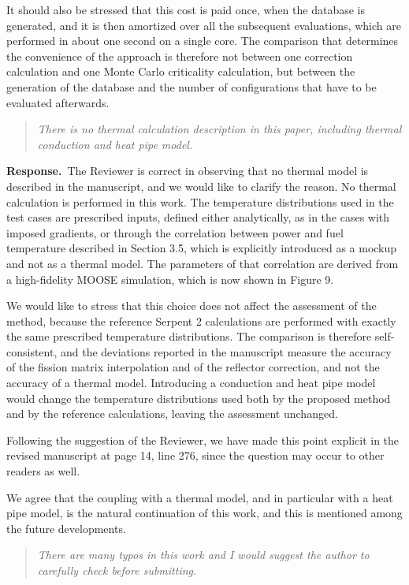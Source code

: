 \documentclass[11pt]{article}
\newenvironment{reviewer}%
  {\medskip\begin{quote}\itshape\color{black!70}}%
  {\end{quote}}
\newcommand{\answer}{\textbf{Response.}\ }
\begin{document}
It should also be stressed that this cost is paid once, when the database is generated, and it is then amortized over all the subsequent evaluations, which are performed in about one second on a single core. The comparison that determines the convenience of the approach is therefore not between one correction calculation and one Monte Carlo criticality calculation, but between the generation of the database and the number of configurations that have to be evaluated afterwards.

\begin{reviewer}
There is no thermal calculation description in this paper, including thermal conduction and heat pipe model.
\end{reviewer}

\answer The Reviewer is correct in observing that no thermal model is described in the manuscript, and we would like to clarify the reason. No thermal calculation is performed in this work. The temperature distributions used in the test cases are prescribed inputs, defined either analytically, as in the cases with imposed gradients, or through the correlation between power and fuel temperature described in Section 3.5, which is explicitly introduced as a mockup and not as a thermal model. The parameters of that correlation are derived from a high-fidelity MOOSE simulation, which is now shown in Figure 9.

We would like to stress that this choice does not affect the assessment of the method, because the reference Serpent 2 calculations are performed with exactly the same prescribed temperature distributions. The comparison is therefore self-consistent, and the deviations reported in the manuscript measure the accuracy of the fission matrix interpolation and of the reflector correction, and not the accuracy of a thermal model. Introducing a conduction and heat pipe model would change the temperature distributions used both by the proposed method and by the reference calculations, leaving the assessment unchanged.

Following the suggestion of the Reviewer, we have made this point explicit in the revised manuscript at page 14, line 276, since the question may occur to other readers as well.

We agree that the coupling with a thermal model, and in particular with a heat pipe model, is the natural continuation of this work, and this is mentioned among the future developments.

\begin{reviewer}
There are many typos in this work and I would suggest the author to carefully check before submitting.
\end{reviewer}
\end{document}
